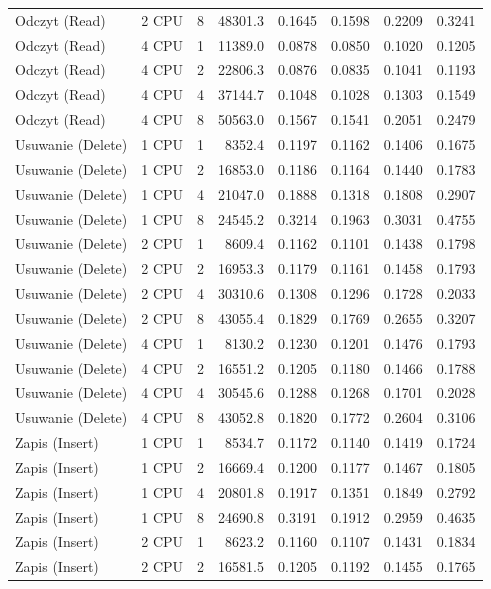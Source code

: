 \begin{table}[ht]
{\begin{tabular}{llcrrrrr}
Odczyt (Read) & 2 CPU & 8 & 48301.3 & 0.1645 & 0.1598 & 0.2209 & 0.3241 \\
Odczyt (Read) & 4 CPU & 1 & 11389.0 & 0.0878 & 0.0850 & 0.1020 & 0.1205 \\
Odczyt (Read) & 4 CPU & 2 & 22806.3 & 0.0876 & 0.0835 & 0.1041 & 0.1193 \\
Odczyt (Read) & 4 CPU & 4 & 37144.7 & 0.1048 & 0.1028 & 0.1303 & 0.1549 \\
Odczyt (Read) & 4 CPU & 8 & 50563.0 & 0.1567 & 0.1541 & 0.2051 & 0.2479 \\
Usuwanie (Delete) & 1 CPU & 1 & 8352.4 & 0.1197 & 0.1162 & 0.1406 & 0.1675 \\
Usuwanie (Delete) & 1 CPU & 2 & 16853.0 & 0.1186 & 0.1164 & 0.1440 & 0.1783 \\
Usuwanie (Delete) & 1 CPU & 4 & 21047.0 & 0.1888 & 0.1318 & 0.1808 & 0.2907 \\
Usuwanie (Delete) & 1 CPU & 8 & 24545.2 & 0.3214 & 0.1963 & 0.3031 & 0.4755 \\
Usuwanie (Delete) & 2 CPU & 1 & 8609.4 & 0.1162 & 0.1101 & 0.1438 & 0.1798 \\
Usuwanie (Delete) & 2 CPU & 2 & 16953.3 & 0.1179 & 0.1161 & 0.1458 & 0.1793 \\
Usuwanie (Delete) & 2 CPU & 4 & 30310.6 & 0.1308 & 0.1296 & 0.1728 & 0.2033 \\
Usuwanie (Delete) & 2 CPU & 8 & 43055.4 & 0.1829 & 0.1769 & 0.2655 & 0.3207 \\
Usuwanie (Delete) & 4 CPU & 1 & 8130.2 & 0.1230 & 0.1201 & 0.1476 & 0.1793 \\
Usuwanie (Delete) & 4 CPU & 2 & 16551.2 & 0.1205 & 0.1180 & 0.1466 & 0.1788 \\
Usuwanie (Delete) & 4 CPU & 4 & 30545.6 & 0.1288 & 0.1268 & 0.1701 & 0.2028 \\
Usuwanie (Delete) & 4 CPU & 8 & 43052.8 & 0.1820 & 0.1772 & 0.2604 & 0.3106 \\
Zapis (Insert) & 1 CPU & 1 & 8534.7 & 0.1172 & 0.1140 & 0.1419 & 0.1724 \\
Zapis (Insert) & 1 CPU & 2 & 16669.4 & 0.1200 & 0.1177 & 0.1467 & 0.1805 \\
Zapis (Insert) & 1 CPU & 4 & 20801.8 & 0.1917 & 0.1351 & 0.1849 & 0.2792 \\
Zapis (Insert) & 1 CPU & 8 & 24690.8 & 0.3191 & 0.1912 & 0.2959 & 0.4635 \\
Zapis (Insert) & 2 CPU & 1 & 8623.2 & 0.1160 & 0.1107 & 0.1431 & 0.1834 \\
Zapis (Insert) & 2 CPU & 2 & 16581.5 & 0.1205 & 0.1192 & 0.1455 & 0.1765 \\

\end{tabular}}
\end{table}
